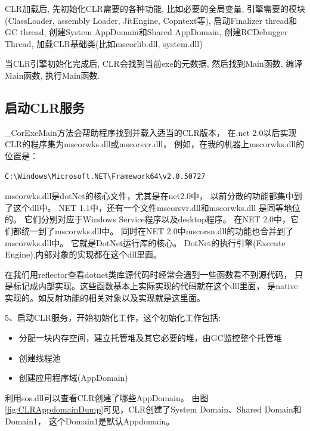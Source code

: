 \documentclass{book}
\begin{document}
CLR加载后, 先初始化CLR需要的各种功能, 比如必要的全局变量, 
引擎需要的模块(ClassLoader, assembly Loader, JitEngine, Copntext等), 
启动Finalizer thread和GC thread, 创建System AppDomain和Shared AppDomain, 
创建RCDebugger Thread, 加载CLR基础类(比如mscorlib.dll, system.dll)
 
当CLR引擎初始化完成后, CLR会找到当前exe的元数据, 然后找到Main函数, 编译Main函数, 
执行Main函数.



\subsection{启动CLR服务}

\_CorExeMain方法会帮助程序找到并载入适当的CLR版本，
在.net 2.0以后实现CLR的程序集为mscorwks.dll或mscorsvr.dll，
例如，在我的机器上mscorwks.dll的位置是：

\begin{lstlisting}[language=Bash]
C:\Windows\Microsoft.NET\Framework64\v2.0.50727
\end{lstlisting}

mscorwks.dll是dotNet的核心文件，尤其是在net2.0中，
以前分散的功能都集中到了这个dll中。 
NET 1.1中，还有一个文件mscorsvr.dll和mscorwks.dll 是同等地位的。 
它们分别对应于Windows Service程序以及desktop程序。 
在NET 2.0中，它们都统一到了mscorwks.dll中。 
同时在NET 2.0中mscorsn.dll的功能也合并到了mscorwks.dll中。 
它就是DotNet运行库的核心。 
DotNet的执行引擎(Execute Engine),内部对象的实现都在这个dll里面。 
   
在我们用reflector查看dotnet类库源代码时经常会遇到一些函数看不到源代码，
只是标记成内部实现。这些函数基本上实际实现的代码就在这个dll里面，
是native实现的。如反射功能的相关对象以及实现就是这里面。 

5、启动CLR服务，开始初始化工作，这个初始化工作包括:

\begin{itemize}
\item{分配一块内存空间，建立托管堆及其它必要的堆，由GC监控整个托管堆}
\item{创建线程池}
\item{创建应用程序域(AppDomain)}
\end{itemize}

利用sos.dll可以查看CLR创建了哪些AppDomain。
由图\ref{fig:CLRAppdomainDump}可见，CLR创建了System Domain、Shared Domain和Domain1，
这个Domain1是默认Appdomain。
\end{document}
